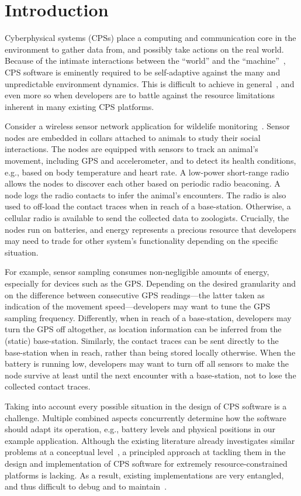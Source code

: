 \section{Introduction}

Cyberphysical systems (CPSs) place a computing and communication core
in the environment to gather data from, and possibly take actions on
the real world. Because of the intimate interactions between the
``world'' and the ``machine''~\cite{jackson}, CPS software is
eminently required to be self-adaptive against the many and
unpredictable environment dynamics. This is difficult to achieve in
general~\cite{}, and even more so when developers are to battle
against the resource limitations inherent in many existing CPS
platforms.

 Consider a wireless sensor network application for
wildelife monitoring~\cite{badgers}. Sensor nodes are embedded in
collars attached to animals to study their social interactions. The
nodes are equipped with sensors to track an animal's movement,
including GPS and accelerometer, and to detect its health conditions,
e.g., based on body temperature and heart rate. A low-power
short-range radio allows the nodes to discover each other based on
periodic radio beaconing. A node logs the radio contacts to infer the
animal's encounters. The radio is also used to off-load the contact
traces when in reach of a base-station. Otherwise, a cellular radio is
available to send the collected data to zoologists. Crucially, the
nodes run on batteries, and energy represents a precious resource that
developers may need to trade for other system's functionality
depending on the specific situation.

For example, sensor sampling consumes non-negligible amounts of
energy, especially for devices such as the GPS. Depending on the
desired granularity and on the difference between consecutive GPS
readings---the latter taken as indication of the movement
speed---developers may want to tune the GPS sampling
frequency. Differently, when in reach of a base-station, developers
may turn the GPS off altogether, as location information can be
inferred from the (static) base-station. Similarly, the contact traces
can be sent directly to the base-station when in reach, rather than
being stored locally otherwise.  When the battery is running low,
developers may want to turn off all sensors to make the node survive
at least until the next encounter with a base-station, not to lose the
collected contact traces.

 Taking into account every possible
situation in the design of CPS software is a challenge. Multiple
combined aspects concurrently determine how the software should adapt
its operation, e.g., battery levels and physical positions in our
example application. Although the existing literature already
investigates similar problems at a conceptual level~\cite{}, a
principled approach at tackling them in the design and implementation
of CPS software for extremely resource-constrained platforms is
lacking. As a result, existing implementations are very entangled, and
thus difficult to debug and to maintain~\cite{programmingsurvey}.

